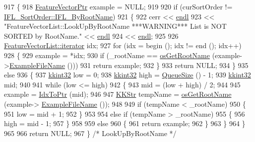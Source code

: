\begin{DoxyCode}
917 \{
918   \hyperlink{class_k_k_m_l_l_1_1_feature_vector}{FeatureVectorPtr}  example = NULL;
919 
920   \textcolor{keywordflow}{if}  (curSortOrder != \hyperlink{class_k_k_m_l_l_1_1_feature_vector_list_a24e87fc6e8ca10537dbcd275bb339a3ca8762df3d5f76e835cf43ca2047fd1da9}{IFL\_SortOrder::IFL\_ByRootName})
921   \{
922     cerr << \hyperlink{namespace_k_k_b_ad1f50f65af6adc8fa9e6f62d007818a8}{endl}
923          << \textcolor{stringliteral}{"FeatureVectorList::LookUpByRootName   ***WARNING***  List is NOT SORTED by RootName."}  << 
      \hyperlink{namespace_k_k_b_ad1f50f65af6adc8fa9e6f62d007818a8}{endl}
924          << \hyperlink{namespace_k_k_b_ad1f50f65af6adc8fa9e6f62d007818a8}{endl};
925 
926     \hyperlink{class_k_k_b_1_1_k_k_queue_aa3c2796a726eea468b94132a9fbf2cfe}{FeatureVectorList::iterator}  idx;
927     \textcolor{keywordflow}{for}  (idx = begin ();  idx != end ();  idx++)
928     \{
929       example = *idx;
930       \textcolor{keywordflow}{if}  (\_rootName == \hyperlink{namespace_k_k_b_af5b668ed9902d7f93b62529664a739f0}{osGetRootName} (example->\hyperlink{class_k_k_m_l_l_1_1_feature_vector_ab47c89ab1e9396664fdc0dc34b6e1ab5}{ExampleFileName} ()))
931         \textcolor{keywordflow}{return} example;
932     \}
933     \textcolor{keywordflow}{return} NULL;
934   \}
935   \textcolor{keywordflow}{else}
936   \{
937     \hyperlink{namespace_k_k_b_a8fa4952cc84fda1de4bec1fbdd8d5b1b}{kkint32}  low  = 0;
938     \hyperlink{namespace_k_k_b_a8fa4952cc84fda1de4bec1fbdd8d5b1b}{kkint32}  high = \hyperlink{class_k_k_b_1_1_k_k_queue_a1dab601f75ee6a65d97f02bddf71c40d}{QueueSize} () - 1;
939     \hyperlink{namespace_k_k_b_a8fa4952cc84fda1de4bec1fbdd8d5b1b}{kkint32}  mid;
940 
941     \textcolor{keywordflow}{while}  (low <= high)
942     \{
943       mid = (low + high) / 2;
944 
945       example = \hyperlink{class_k_k_b_1_1_k_k_queue_acce2bdd8b3327e38266cf198382cd852}{IdxToPtr} (mid);
946 
947       \hyperlink{class_k_k_b_1_1_k_k_str}{KKStr}  tempName = \hyperlink{namespace_k_k_b_af5b668ed9902d7f93b62529664a739f0}{osGetRootName} (example->
      \hyperlink{class_k_k_m_l_l_1_1_feature_vector_ab47c89ab1e9396664fdc0dc34b6e1ab5}{ExampleFileName} ());
948 
949       \textcolor{keywordflow}{if}  (tempName < \_rootName)
950       \{
951         low = mid + 1;
952       \}
953 
954       \textcolor{keywordflow}{else} \textcolor{keywordflow}{if}  (tempName > \_rootName)
955       \{
956         high = mid - 1;
957       \}
958 
959       \textcolor{keywordflow}{else}
960       \{
961         \textcolor{keywordflow}{return}  example;
962       \}
963     \}
964   \}
965 
966   \textcolor{keywordflow}{return}  NULL;
967 \}  \textcolor{comment}{/* LookUpByRootName */}
\end{DoxyCode}
